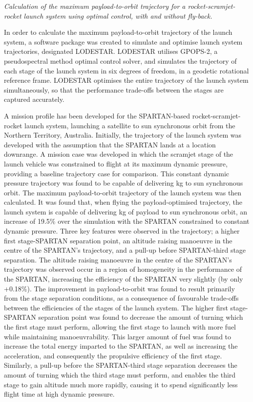 	\vspace{10pt}
\emph{Calculation of the maximum payload-to-orbit trajectory for a rocket-scramjet-rocket launch system using optimal control, with and without fly-back.}

In order to calculate the maximum payload-to-orbit trajectory of the launch system, a software package was created to simulate and optimise launch system trajectories, designated LODESTAR. LODESTAR utilises GPOPS-2, a pseudospectral method optimal control solver, and simulates the trajectory of each stage of the launch system in six degrees of freedom, in a geodetic rotational reference frame. 
LODESTAR optimises the entire trajectory of the launch system simultaneously, so that the performance trade-offs between the stages are captured accurately.

A mission profile has been developed for the SPARTAN-based rocket-scramjet-rocket launch system, launching a satellite to sun synchronous orbit from the Northern Territory, Australia. 
Initially, the trajectory of the launch system was developed with the assumption that the SPARTAN lands at a location downrange.
A mission case was developed in which the scramjet stage of the launch vehicle was constrained to flight at its maximum dynamic pressure, providing a baseline trajectory case for comparison. This constant dynamic pressure trajectory was found to be capable of delivering \PayloadToOrbitConstqNoReturn kg to sun synchronous orbit. 
The maximum payload-to-orbit trajectory of the launch system was then calculated. It was found that, when flying the payload-optimised trajectory, the launch system is capable of delivering \PayloadToOrbitStandardNoReturn kg of payload to sun synchronous orbit, an increase of 19.5\% over the simulation with the SPARTAN constrained to constant dynamic pressure. 
Three key features were observed in the trajectory; a higher first stage-SPARTAN separation point, an altitude raising manoeuvre in the centre of the SPARTAN's trajectory, and a pull-up before SPARTAN-third stage separation.
The altitude raising manoeuvre in the centre of the SPARTAN's trajectory was observed occur in a region of homogeneity in the performance of the SPARTAN, increasing the efficiency of the SPARTAN very slightly (by only +0.18\%). 
The improvement in payload-to-orbit was found to result primarily from the stage separation conditions, as a consequence of favourable trade-offs between the efficiencies of the stages of the launch system.
The higher first stage-SPARTAN separation point was found to decrease the amount of turning which the first stage must perform, allowing the first stage to launch with more fuel while maintaining manoeuvrability. This larger amount of fuel was found to increase the total energy imparted to the SPARTAN, as well as increasing the acceleration, and consequently the propulsive efficiency of the first stage. Similarly, a pull-up before the SPARTAN-third stage separation decreases the amount of turning which the third stage must perform, and enables the third stage to gain altitude much more rapidly, causing it to spend significantly less flight time at high dynamic pressure. 
